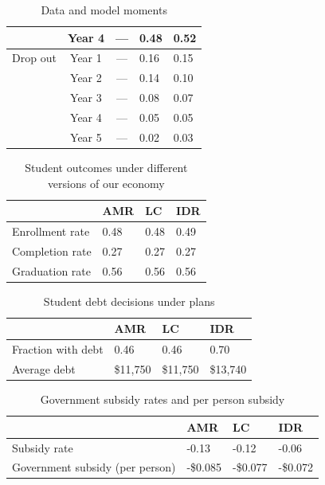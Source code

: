\begin{table}[H]
\begin{tabular}{lccll}
                         & Year 4 & --- & 0.48 & 0.52 \\
      \midrule
      Drop out & Year 1 & --- & 0.16 & 0.15 \\
               & Year 2 & --- & 0.14 & 0.10 \\
               & Year 3 & --- & 0.08 & 0.07 \\
               & Year 4 & --- & 0.05 & 0.05 \\
               & Year 5 & --- & 0.02 & 0.03 \\
      \bottomrule
    \end{tabular}
    \caption{Data and model moments}
    \label{table:moments}
  \end{table}

  \begin{table}[H]
    \begin{tabular}{llll}
      \toprule
      & \textbf{AMR} & \textbf{LC} & \textbf{IDR} \\
      \midrule
      Enrollment rate & 0.48 & 0.48 & 0.49 \\
      Completion rate & 0.27 & 0.27 & 0.27 \\
      Graduation rate & 0.56 & 0.56 & 0.56 \\
      \bottomrule
    \end{tabular}
    \caption{Student outcomes under different versions of our economy}
    \label{table:students}
  \end{table}

  \begin{table}[H]
    \begin{tabular}{llll}
      \toprule
      & \textbf{AMR} & \textbf{LC} & \textbf{IDR} \\
      \midrule
      Fraction with debt & 0.46 & 0.46 & 0.70 \\
      Average debt & \$11,750 & \$11,750 & \$13,740 \\
      \bottomrule
    \end{tabular}
    \caption{Student debt decisions under plans}
    \label{table:debt}
  \end{table}

  \begin{table}[H]
    \begin{tabular}{llll}
      \toprule
      & \textbf{AMR} & \textbf{LC} & \textbf{IDR} \\
      \midrule
      Subsidy rate & -0.13 & -0.12 & -0.06 \\
      Government subsidy (per person) & -\$0.085 & -\$0.077 & -\$0.072 \\
      \bottomrule
    \end{tabular}
    \caption{Government subsidy rates and per person subsidy}
    \label{table:cost}
  \end{table}

